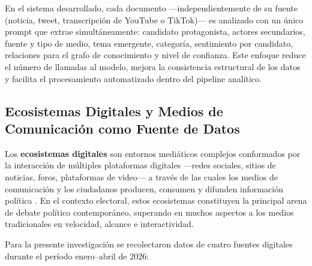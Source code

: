 En el sistema desarrollado, cada documento —independientemente de su fuente (noticia, tweet, transcripción de YouTube o TikTok)— es analizado con un único prompt que extrae simultáneamente: candidato protagonista, actores secundarios, fuente y tipo de medio, tema emergente, categoría, sentimiento por candidato, relaciones para el grafo de conocimiento y nivel de confianza. Este enfoque reduce el número de llamadas al modelo, mejora la consistencia estructural de los datos y facilita el procesamiento automatizado dentro del pipeline analítico.

\subsection{Ecosistemas Digitales y Medios de Comunicación como Fuente de Datos}

Los \textbf{ecosistemas digitales} son entornos mediáticos complejos conformados por la interacción de múltiples plataformas digitales —redes sociales, sitios de noticias, foros, plataformas de video— a través de las cuales los medios de comunicación y los ciudadanos producen, consumen y difunden información política \parencite{mc_chadwick2013hybrid}. En el contexto electoral, estos ecosistemas constituyen la principal arena de debate político contemporáneo, superando en muchos aspectos a los medios tradicionales en velocidad, alcance e interactividad.

Para la presente investigación se recolectaron datos de cuatro fuentes digitales durante el período enero–abril de 2026:

